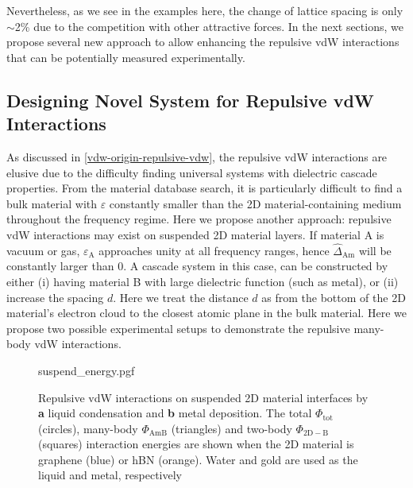 Nevertheless, as we see in the examples here, the change of lattice
spacing is only $\sim{}$2\% due to the competition with other
attractive forces.
%
In the next sections, we propose several new approach to allow enhancing the repulsive vdW interactions that can be potentially measured experimentally.

\subsection{Designing Novel System for Repulsive vdW Interactions}
\label{sec:proposing-new-system}

As discussed in \autoref{vdw-origin-repulsive-vdw}, the repulsive vdW
interactions are elusive due to the difficulty finding universal
systems with dielectric cascade properties.
%
%
From the material database search, it is particularly difficult to
find a bulk material with $\varepsilon$ constantly smaller than the 2D
material-containing medium throughout the frequency
regime.
Here we propose another approach: repulsive vdW interactions may exist
on suspended 2D material layers. If material A is vacuum or gas,
$\varepsilon_{\mathrm{A}}$ approaches unity at all frequency ranges,
hence $\hat{\Delta}_{\mathrm{Am}}$ will be constantly larger than 0. A
cascade system in this case, can be constructed by either (i) having
material B with large dielectric function (such as metal), or (ii)
increase the spacing $d$.
%
Here we treat the
distance $d$ as from the bottom of the 2D material's electron cloud to
the closest atomic plane in the bulk material.
%
%
Here we propose two possible experimental setups to demonstrate the
repulsive many-body vdW interactions.

\begin{figure}[!htbp]
  \centering{}
  {suspend_energy.pgf}
  \caption{\label{fig:vdw-repul-suspen} %
    Repulsive vdW interactions on suspended 2D material interfaces by
    \textbf{a} liquid condensation and \textbf{b} metal deposition.
    The total $\Phi_{\mathrm{tot}}$ (circles), many-body
    $\Phi_{\mathrm{AmB}}$ (triangles) and two-body
    $\Phi_{\mathrm{2D-B}}$ (squares) interaction energies are shown
    when the 2D material is graphene (blue) or hBN (orange). Water and
    gold are used as the liquid and metal, respectively}
\end{figure}


